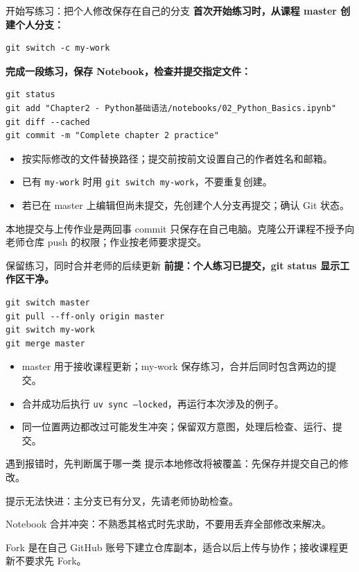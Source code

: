 \documentclass[9pt]{ctexbeamer}
\begin{document}
\begin{frame}[fragile]{开始写练习：把个人修改保存在自己的分支}
  \textbf{首次开始练习时，从课程 master 创建个人分支：}
\begin{lstlisting}[language={},numbers=none]
git switch -c my-work
\end{lstlisting}
  \textbf{完成一段练习，保存 Notebook，检查并提交指定文件：}
\begin{lstlisting}[language={},numbers=none]
git status
git add "Chapter2 - Python基础语法/notebooks/02_Python_Basics.ipynb"
git diff --cached
git commit -m "Complete chapter 2 practice"
\end{lstlisting}
  \begin{itemize}
    \item 按实际修改的文件替换路径；提交前按前文设置自己的作者姓名和邮箱。
    \item 已有 \texttt{my-work} 时用 \texttt{git switch my-work}，不要重复创建。
    \item 若已在 master 上编辑但尚未提交，先创建个人分支再提交；确认 Git 状态。
  \end{itemize}
  \begin{block}{本地提交与上传作业是两回事}
    commit 只保存在自己电脑。克隆公开课程不授予向老师仓库 push 的权限；作业按老师要求提交。
  \end{block}
\end{frame}

\begin{frame}[fragile]{保留练习，同时合并老师的后续更新}
  \textbf{前提：个人练习已提交，git status 显示工作区干净。}
\begin{lstlisting}[language={},numbers=none]
git switch master
git pull --ff-only origin master
git switch my-work
git merge master
\end{lstlisting}
  \begin{itemize}
    \item master 用于接收课程更新；my-work 保存练习，合并后同时包含两边的提交。
    \item 合并成功后执行 \texttt{uv sync --locked}，再运行本次涉及的例子。
    \item 同一位置两边都改过可能发生冲突；保留双方意图，处理后检查、运行、提交。
  \end{itemize}
  \begin{block}{遇到报错时，先判断属于哪一类}
    提示本地修改将被覆盖：先保存并提交自己的修改。\par
    提示无法快进：主分支已有分叉，先请老师协助检查。\par
    Notebook 合并冲突：不熟悉其格式时先求助，不要用丢弃全部修改来解决。
  \end{block}
  {\small Fork 是在自己 GitHub 账号下建立仓库副本，适合以后上传与协作；接收课程更新不要求先 Fork。}
\end{frame}
\end{document}
